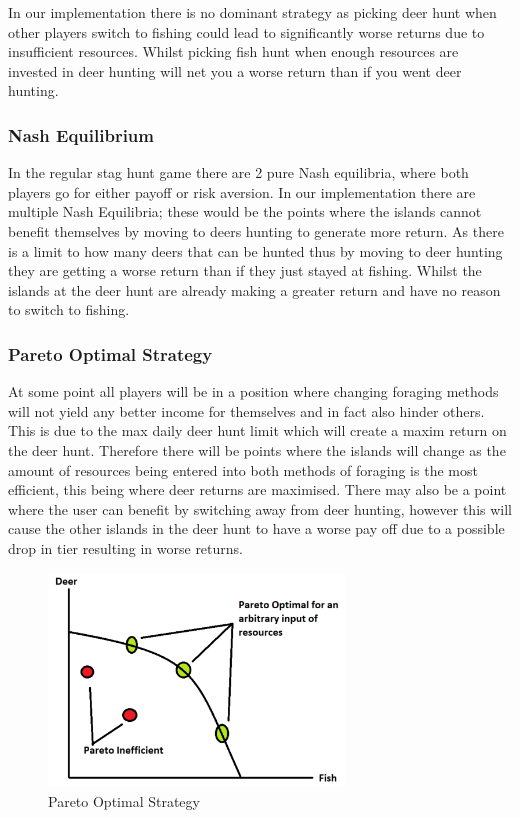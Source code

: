 In our implementation there is no dominant strategy as picking deer hunt when other players switch to fishing could lead to significantly worse returns due to insufficient resources. Whilst picking fish hunt when enough resources are invested in deer hunting will net you a worse return than if you went deer hunting.\\

\subsubsection{Nash Equilibrium}

In the regular stag hunt game there are 2 pure Nash equilibria, where both players go for either payoff or risk aversion. In our implementation there are multiple Nash Equilibria; these would be the points where the islands cannot benefit themselves by moving to deers hunting to generate more return. As there is a limit to how many deers that can be hunted thus by moving to deer hunting they are getting a worse return than if they just stayed at fishing. Whilst the islands at the deer hunt are already making a greater return and have no reason to switch to fishing.\\ 

\subsubsection{Pareto Optimal Strategy}

At some point all players will be in a position where changing foraging methods will not yield any better income for themselves and in fact also hinder others. This is due to the max daily deer hunt limit which will create a maxim return on the deer hunt. Therefore there will be points where the islands will change as the amount of resources being entered into both methods of foraging is the most efficient, this being where deer returns are maximised. There may also be a point where the user can benefit by switching away from deer hunting, however this will cause the other islands in the deer hunt to have a worse pay off due to a possible drop in tier resulting in worse returns.\\

\begin{figure}[!htb]
    \centering
    \includegraphics[width=0.7\textwidth]{04_environment/Images/Pareto Optimal Strategy.PNG}
    \caption{Pareto Optimal Strategy}
    \label{Images:Pareto Optimal Strategy}
\end{figure}


